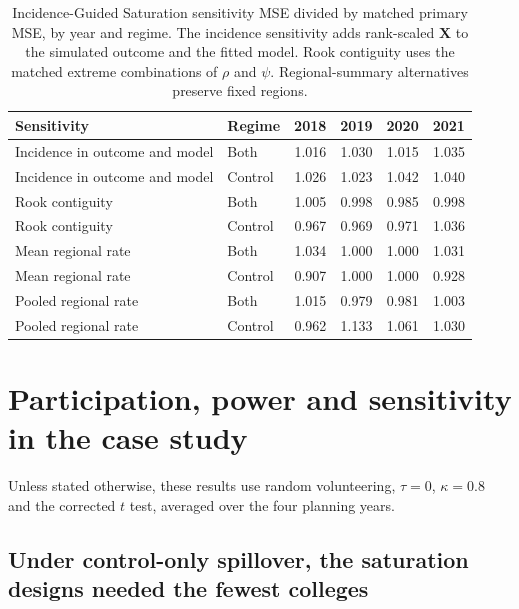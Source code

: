 \documentclass[11pt]{article}
\begin{document}
\begin{table}[!htb]
\small
\centering

\caption{Incidence-Guided Saturation sensitivity MSE divided by matched primary MSE, by year and regime. The incidence sensitivity adds rank-scaled $\mathbf{X}$ to the simulated outcome and the fitted model. Rook contiguity uses the matched extreme combinations of $\rho$ and $\psi$. Regional-summary alternatives preserve fixed regions.}
\label{tab:nc-summary-sens}

\begin{tabular}{llrrrr}
\toprule
Sensitivity & Regime & 2018 & 2019 & 2020 & 2021 \\
\midrule
Incidence in outcome and model & Both & 1.016 & 1.030 & 1.015 & 1.035 \\
Incidence in outcome and model & Control & 1.026 & 1.023 & 1.042 & 1.040 \\
Rook contiguity & Both & 1.005 & 0.998 & 0.985 & 0.998 \\
Rook contiguity & Control & 0.967 & 0.969 & 0.971 & 1.036 \\
Mean regional rate & Both & 1.034 & 1.000 & 1.000 & 1.031 \\
Mean regional rate & Control & 0.907 & 1.000 & 1.000 & 0.928 \\
Pooled regional rate & Both & 1.015 & 0.979 & 0.981 & 1.003 \\
Pooled regional rate & Control & 0.962 & 1.133 & 1.061 & 1.030 \\

\bottomrule
\end{tabular}
\end{table}
\FloatBarrier
\section{Participation, power and sensitivity in the case study}\label{app:nc-ext}


Unless stated otherwise, these results use random volunteering,
$\tau=0$, $\kappa=0.8$ and the corrected $t$ test, averaged over the
four planning years.


\subsection{Under control-only spillover, the saturation designs needed the fewest colleges}\label{planning-for-realistic-participation}
\end{document}
